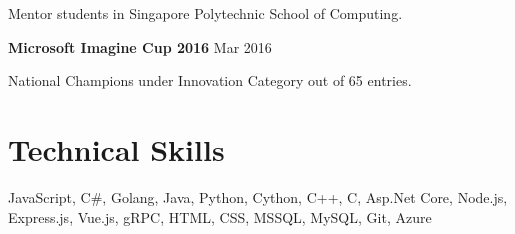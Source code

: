 \documentclass[11pt]{article} %
\begin{document}
Mentor students in Singapore Polytechnic School of Computing.

\bigskip

\textbf{Microsoft Imagine Cup 2016} \hfill Mar 2016

National Champions under Innovation Category out of 65 entries.




\section*{Technical Skills}
JavaScript, C\#, Golang, Java, Python, Cython, C++, C, Asp.Net Core, Node.js, Express.js, Vue.js, gRPC, HTML, CSS, MSSQL, MySQL, Git, Azure
\end{document}

